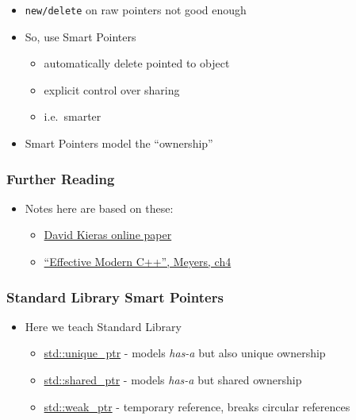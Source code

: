 \begin{itemize}
\itemsep1pt\parskip0pt
\item
  \texttt{new/delete} on raw pointers not good enough
\item
  So, use Smart Pointers

  \begin{itemize}
  \itemsep1pt\parskip0pt
  \item
    automatically delete pointed to object
  \item
    explicit control over sharing
  \item
    i.e.~smarter
  \end{itemize}
\item
  Smart Pointers model the ``ownership''
\end{itemize}

\subsubsection{Further Reading}\label{further-reading}

\begin{itemize}
\itemsep1pt\parskip0pt
\item
  Notes here are based on these:

  \begin{itemize}
  \itemsep1pt\parskip0pt
  \item
    \href{http://www.umich.edu/~eecs381/handouts/C++11_smart_ptrs.pdf}{David
    Kieras online paper}
  \item
    \href{https://www.amazon.co.uk/Effective-Modern-Specific-Ways-Improve/dp/1491903996/ref=sr_1_1?ie=UTF8\&qid=1484571499\&sr=8-1\&keywords=Effective+Modern+C\%2B\%2B}{``Effective
    Modern C++'', Meyers, ch4}
  \end{itemize}
\end{itemize}

\subsubsection{Standard Library Smart
Pointers}\label{standard-library-smart-pointers}

\begin{itemize}
\itemsep1pt\parskip0pt
\item
  Here we teach Standard Library

  \begin{itemize}
  \itemsep1pt\parskip0pt
  \item
    \href{http://en.cppreference.com/w/cpp/memory/unique_ptr}{std::unique\_ptr}
    - models \emph{has-a} but also unique ownership
  \item
    \href{http://en.cppreference.com/w/cpp/memory/shared_ptr}{std::shared\_ptr}
    - models \emph{has-a} but shared ownership
  \item
    \href{http://en.cppreference.com/w/cpp/memory/weak_ptr}{std::weak\_ptr}
    - temporary reference, breaks circular references
  \end{itemize}
\end{itemize}

